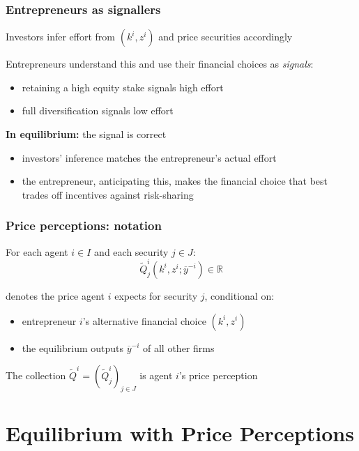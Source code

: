 \documentclass[blue]{beamer}
\def\R{\mathbb{R}}
\theoremstyle{definition}
\theoremstyle{example}
\begin{document}
\begin{frame}\frametitle{Entrepreneurs as signallers}
Investors infer effort from $(k^i, z^i)$ and price securities accordingly
\bigskip

Entrepreneurs understand this and use their financial choices as \emph{signals}:
\begin{itemize}
\item retaining a high equity stake signals high effort
\item full diversification signals low effort
\end{itemize}
\bigskip

\textbf{In equilibrium:} the signal is correct
\begin{itemize}
\item investors' inference matches the entrepreneur's actual effort
\item the entrepreneur, anticipating this, makes the financial choice that best trades off incentives against risk-sharing
\end{itemize}
\end{frame}

\begin{frame}\frametitle{Price perceptions: notation}
For each agent $i \in I$ and each security $j \in J$:
\begin{equation*}
\widetilde{Q}^i_j(k^i, z^i; \overline{y}^{-i}) \in \R
\end{equation*}
\bigskip

denotes the price agent $i$ expects for security $j$, conditional on:
\begin{itemize}
\item entrepreneur $i$'s alternative financial choice $(k^i, z^i)$
\item the equilibrium outputs $\overline{y}^{-i}$ of all other firms
\end{itemize}
\bigskip

The collection $\widetilde{Q}^i = (\widetilde{Q}^i_j)_{j \in J}$ is agent $i$'s price perception
\end{frame}

\section{Equilibrium with Price Perceptions}
\end{document}
